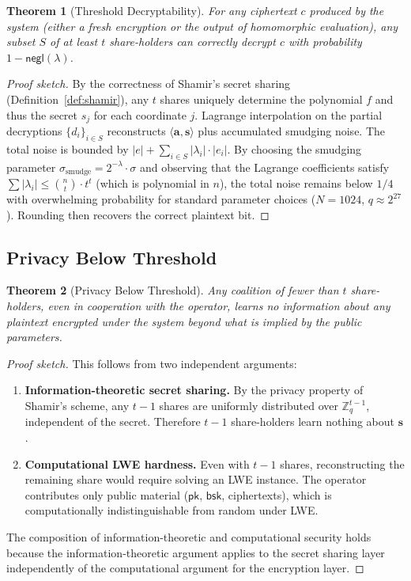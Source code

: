 \documentclass[11pt,a4paper]{article}
\newtheorem{theorem}{Theorem}[section]
\begin{document}
\begin{theorem}[Threshold Decryptability]
\label{thm:threshold-decrypt}
For any ciphertext $c$ produced by the system (either a fresh encryption
or the output of homomorphic evaluation), any subset $S$ of at least $t$
share-holders can correctly decrypt $c$ with probability
$1 - \mathsf{negl}(\lambda)$.
\end{theorem}

\begin{proof}[Proof sketch]
By the correctness of Shamir's secret sharing
(Definition~\ref{def:shamir}), any $t$ shares uniquely determine the
polynomial $f$ and thus the secret $s_j$ for each coordinate $j$.
Lagrange interpolation on the partial decryptions $\{d_i\}_{i \in S}$
reconstructs $\langle \mathbf{a}, \mathbf{s} \rangle$ plus accumulated
smudging noise.  The total noise is bounded by $|e| + \sum_{i \in S}
|\lambda_i| \cdot |e_i|$.  By choosing the smudging parameter
$\sigma_{\text{smudge}} = 2^{-\lambda} \cdot \sigma$ and observing that
the Lagrange coefficients satisfy $\sum |\lambda_i| \leq \binom{n}{t}
\cdot t^t$ (which is polynomial in $n$), the total noise remains below
$1/4$ with overwhelming probability for standard parameter choices
($N = 1024$, $q \approx 2^{27}$).  Rounding then recovers the correct
plaintext bit.
\end{proof}

\subsection{Privacy Below Threshold}

\begin{theorem}[Privacy Below Threshold]
\label{thm:privacy}
Any coalition of fewer than $t$ share-holders, even in cooperation with
the operator, learns no information about any plaintext encrypted under
the system beyond what is implied by the public parameters.
\end{theorem}

\begin{proof}[Proof sketch]
This follows from two independent arguments:
\begin{enumerate}[nosep]
  \item \textbf{Information-theoretic secret sharing.}  By the privacy
        property of Shamir's scheme, any $t-1$ shares are uniformly
        distributed over $\mathbb{Z}_q^{t-1}$, independent of the secret.
        Therefore $t-1$ share-holders learn nothing about $\mathbf{s}$.
  \item \textbf{Computational LWE hardness.}  Even with $t-1$ shares,
        reconstructing the remaining share would require solving an LWE
        instance.  The operator contributes only public material
        ($\mathsf{pk}$, $\mathsf{bsk}$, ciphertexts), which is
        computationally indistinguishable from random under LWE.
\end{enumerate}
The composition of information-theoretic and computational security
holds because the information-theoretic argument applies to the secret
sharing layer independently of the computational argument for the
encryption layer.
\end{proof}
\end{document}
